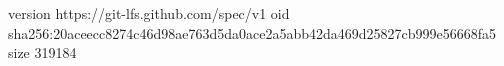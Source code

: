 version https://git-lfs.github.com/spec/v1
oid sha256:20aceecc8274c46d98ae763d5da0ace2a5abb42da469d25827cb999e56668fa5
size 319184
